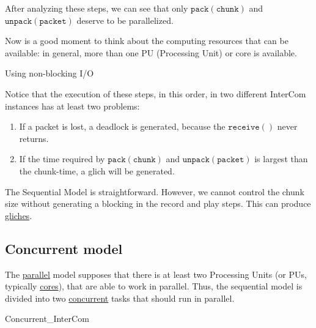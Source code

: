 After analyzing these steps, we can see that only $\mathtt{pack(chunk)}$ and $\mathtt{unpack(packet)}$ deserve to be parallelized.

Now is a good moment to think about the computing resources that can
be available: in general, more than one PU (Processing Unit) or core is available.

Using non-blocking I/O 
  
Notice that the execution of these steps, in this order, in two
different InterCom instances has at least two problems:
\begin{enumerate}
\item If a packet is lost, a deadlock is generated, because the
  $\mathtt{receive()}$ never returns.
\item If the time required by $\mathtt{pack(chunk)}$ and
  $\mathtt{unpack(packet)}$ is largest than the chunk-time, a glich
  will be generated.
\end{enumerate}

The Sequential Model is straightforward. However, we cannot control
the chunk size without generating a blocking in the record and play
steps. This can produce
\href{https://en.wikipedia.org/wiki/Glitch_(music)}{gliches}.

\subsection{Concurrent model}

The \href{https://en.wikipedia.org/wiki/Parallel_computing}{parallel}
model supposes that there is at least two Processing Units (or PUs,
typically
\href{https://en.wikipedia.org/wiki/Multi-core_processor}{cores}),
that are able to work in parallel. Thus, the sequential model is
divided into two
\href{https://en.wikipedia.org/wiki/Concurrency_(computer_science)}{concurrent}
tasks that should run in parallel.

\begin{pseudocode}{Concurrent\_InterCom}{~}
  \BEGIN
     \GETS {}\\
     \GETS {}\\
  \END
  \ENDPROCEDURE
  \BEGIN
     \GETS {}\\
     \GETS {}\\
  \END
  \ENDPROCEDURE
\end{pseudocode}


